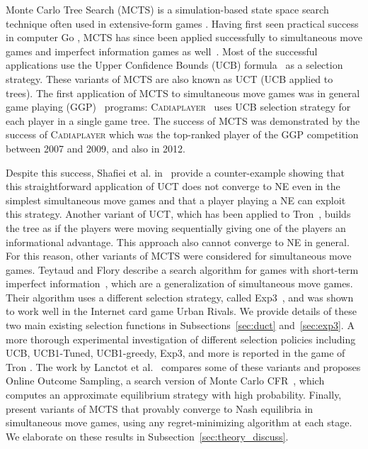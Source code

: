 Monte Carlo Tree Search (MCTS) is a simulation-based state space search technique often used in extensive-form games \cite{Coulom06,UCT}. 
Having first seen practical success in computer Go \cite{Gelly2011,Gelly12}, MCTS has since been applied successfully to simultaneous move games and imperfect information games as well~\cite{Ciancarini10Kriegspiel,Cowling12ISMCTS,15aamas-iioos}. 
Most of the successful applications use the Upper Confidence Bounds (UCB) formula~\cite{UCB} as a selection strategy. These variants of MCTS are also known as UCT (UCB applied to trees). The first application of MCTS to simultaneous move games was in general game playing (GGP)~\cite{GGP} programs: \textsc{Cadiaplayer}~\cite{Cadiaplayer,Finnsson12} uses UCB selection strategy for each player in a single game tree. The success of MCTS was demonstrated by the success of \textsc{Cadiaplayer} which was the top-ranked player of the GGP competition between 2007 and 2009, and also in 2012.

Despite this success, Shafiei et al. in~\cite{Shafiei09} provide a counter-example showing that this straightforward application of UCT does not
converge to NE even in the simplest simultaneous move games and that a player playing a NE can exploit this strategy. Another variant of UCT, which has been applied to  Tron~\cite{Samothrakis10Tron}, builds the tree as if the players were moving sequentially giving one of the players an informational advantage. This approach also cannot converge to NE in general. For this reason, other variants of MCTS were considered for simultaneous move games. Teytaud and Flory describe a search algorithm for games with short-term imperfect information~\cite{Teytaud11Upper}, which are a generalization of simultaneous move games. Their algorithm uses a different selection strategy, called Exp3~\cite{Auer2003Exp3},
and was shown to work well in the Internet card game Urban Rivals. We provide details of these two main existing selection functions in Subsections~\ref{sec:duct} and~\ref{sec:exp3}.
A more thorough experimental investigation of different selection policies including UCB, UCB1-Tuned, UCB1-greedy, Exp3, and more is reported in the game of Tron \cite{Perick12Comparison}. The work by Lanctot et al.~\cite{Lanctot13Goofspiel} compares some of these variants and proposes Online Outcome Sampling, a search version of Monte Carlo CFR~\cite{Lanctot09Sampling}, which computes an approximate equilibrium strategy with high probability. 
Finally, \cite{lisy2013-nips, Kovarik2015Analysis} present variants of MCTS that provably converge to Nash equilibria in simultaneous move games, 
using any regret-minimizing algorithm at each stage. We elaborate on these results in Subsection~\ref{sec:theory_discuss}.

